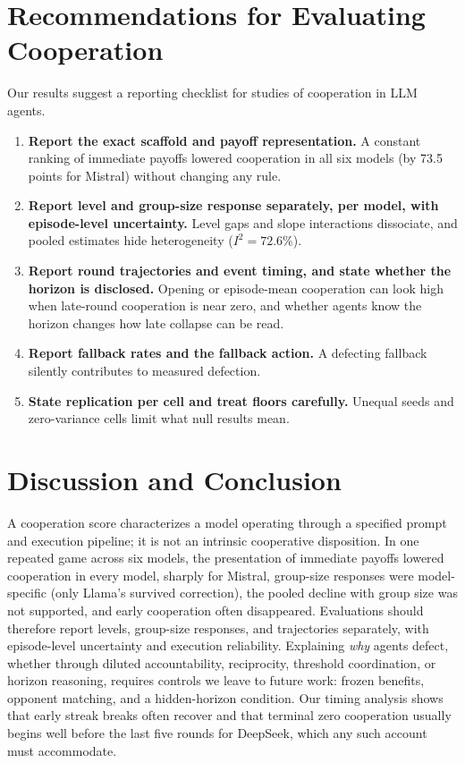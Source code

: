 \documentclass[11pt]{article}
\begin{document}
\section{Recommendations for Evaluating Cooperation}
\label{sec:recs}
Our results suggest a reporting checklist for studies of cooperation in LLM agents.
\begin{enumerate}
\item \textbf{Report the exact scaffold and payoff representation.} A constant ranking of immediate payoffs lowered cooperation in all six models (by 73.5 points for Mistral) without changing any rule.
\item \textbf{Report level and group-size response separately, per model, with episode-level uncertainty.} Level gaps and slope interactions dissociate, and pooled estimates hide heterogeneity ($I^2=72.6\%$).
\item \textbf{Report round trajectories and event timing, and state whether the horizon is disclosed.} Opening or episode-mean cooperation can look high when late-round cooperation is near zero, and whether agents know the horizon changes how late collapse can be read.
\item \textbf{Report fallback rates and the fallback action.} A defecting fallback silently contributes to measured defection.
\item \textbf{State replication per cell and treat floors carefully.} Unequal seeds and zero-variance cells limit what null results mean.
\end{enumerate}

\section{Discussion and Conclusion}
A cooperation score characterizes a model operating through a specified prompt and execution pipeline; it is not an intrinsic cooperative disposition. In one repeated game across six models, the presentation of immediate payoffs lowered cooperation in every model, sharply for Mistral, group-size responses were model-specific (only Llama's survived correction), the pooled decline with group size was not supported, and early cooperation often disappeared. Evaluations should therefore report levels, group-size responses, and trajectories separately, with episode-level uncertainty and execution reliability. Explaining \emph{why} agents defect, whether through diluted accountability, reciprocity, threshold coordination, or horizon reasoning, requires controls we leave to future work: frozen benefits, opponent matching, and a hidden-horizon condition. Our timing analysis shows that early streak breaks often recover and that terminal zero cooperation usually begins well before the last five rounds for DeepSeek, which any such account must accommodate.
\end{document}
